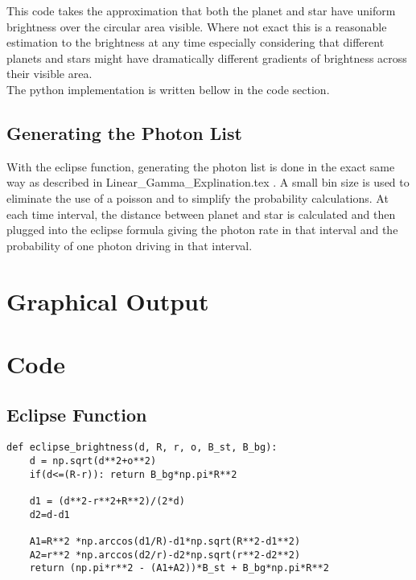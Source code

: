 \documentclass[aps,letterpaper,10pt]{revtex4}
\begin{document}
This code takes the approximation that both the planet and star have uniform brightness over the circular area visible. Where not exact this is a reasonable estimation to the brightness at any time especially considering that different planets and stars might have dramatically different gradients of brightness across their visible area.\\

The python implementation is written bellow in the code section.

\vspace{3mm}

\subsection{Generating the Photon List}
With the eclipse function, generating the photon list is done in the exact same way as described in Linear\_Gamma\_Explination.tex . A small bin size is used to eliminate the use of a poisson and to simplify the probability calculations. At each time interval, the distance between planet and star is calculated and then plugged into the eclipse formula giving the photon rate in that interval and the probability of one photon driving in that interval.



\vspace{3mm} 

\section{Graphical Output}

\begin{figure}[h!]
\vspace{3mm}
\end{figure}


\section{Code}
\subsection{Eclipse Function}

\begin{verbatim}
def eclipse_brightness(d, R, r, o, B_st, B_bg):
	d = np.sqrt(d**2+o**2)
	if(d<=(R-r)): return B_bg*np.pi*R**2
	
	d1 = (d**2-r**2+R**2)/(2*d)
	d2=d-d1
	
	A1=R**2 *np.arccos(d1/R)-d1*np.sqrt(R**2-d1**2)
	A2=r**2 *np.arccos(d2/r)-d2*np.sqrt(r**2-d2**2)
	return (np.pi*r**2 - (A1+A2))*B_st + B_bg*np.pi*R**2
\end{verbatim}
\end{document}
